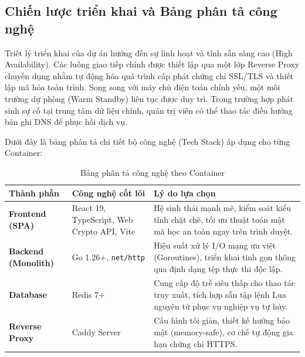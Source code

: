 \subsection{Chiến lược triển khai và Bảng phân tả công nghệ}

Triết lý triển khai của dự án hướng đến sự linh hoạt và tính sẵn sàng cao (High Availability). Các luồng giao tiếp chính được thiết lập qua một lớp Reverse Proxy chuyên dụng nhằm tự động hóa quá trình cấp phát chứng chỉ SSL/TLS và thiết lập mã hóa toàn trình. Song song với máy chủ điện toán chính yếu, một môi trường dự phòng (Warm Standby) liên tục được duy trì. Trong trường hợp phát sinh sự cố tại trung tâm dữ liệu chính, quản trị viên có thể thao tác điều hướng bản ghi DNS để phục hồi dịch vụ.

Dưới đây là bảng phân tả chi tiết bộ công nghệ (Tech Stack) áp dụng cho từng Container:

\begin{table}[H]
\centering
\caption{Bảng phân tả công nghệ theo Container}
\renewcommand{\arraystretch}{1.5}
\begin{tabular}{|p{3.5cm}|p{5cm}|p{6cm}|}
\hline
\textbf{Thành phần} & \textbf{Công nghệ cốt lõi} & \textbf{Lý do lựa chọn} \\
\hline
\textbf{Frontend (SPA)} & React 19, TypeScript, Web Crypto API, Vite & Hệ sinh thái mạnh mẽ, kiểm soát kiểu tĩnh chặt chẽ, tối ưu thuật toán mật mã học an toàn ngay trên trình duyệt. \\
\hline
\textbf{Backend (Monolith)} & Go 1.26+, \texttt{net/http} & Hiệu suất xử lý I/O mạng ưu việt (Goroutines), triển khai tinh gọn thông qua định dạng tệp thực thi độc lập. \\
\hline
\textbf{Database} & Redis 7+ & Cung cấp độ trễ siêu thấp cho thao tác truy xuất, tích hợp sẵn tập lệnh Lua nguyên tử phục vụ nghiệp vụ tự hủy. \\
\hline
\textbf{Reverse Proxy} & Caddy Server & Cấu hình tối giản, thiết kế hướng bảo mật (memory-safe), cơ chế tự động gia hạn chứng chỉ HTTPS. \\
\hline
\end{tabular}
\label{tab:tech_stack}
\end{table}